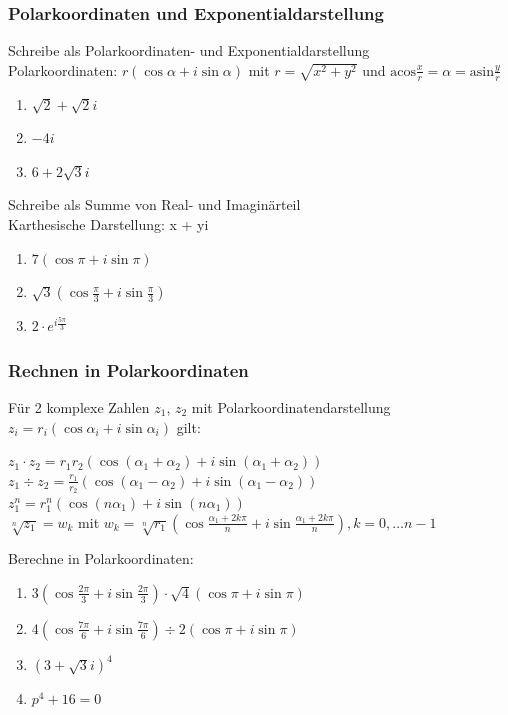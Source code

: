 \documentclass[11pt, a4paper]{article}
\newcommand\braces[1]{\left(#1\right)}
\newcommand{\acos}{\mathrm{acos}}
\newcommand{\asin}{\mathrm{asin}}
\begin{document}
\subsubsection{Polarkoordinaten und Exponentialdarstellung}
Schreibe als Polarkoordinaten- und Exponentialdarstellung \\
Polarkoordinaten: $r(\cos \alpha + i \sin \alpha)$ mit $r=\sqrt{x^2+y^2}$ und $\acos \frac{x}{r} = \alpha = \asin \frac{y}{r}$
\begin{enumerate}
	\item $\sqrt{2}+\sqrt{2}i$
	\item $-4i$
	\item $6+2\sqrt{3}i$
\end{enumerate}
Schreibe als Summe von Real- und Imaginärteil \\
Karthesische Darstellung: x + yi
\begin{enumerate}
	\item $7 \left( \cos \pi + i \sin \pi \right)$
	\item $\sqrt{3} \left( \cos \frac{\pi}{3} + i \sin \frac{\pi}{3} \right)$
	\item $2 \cdot e^{i \frac{5 \pi}{3}}$
\end{enumerate}

\subsubsection{Rechnen in Polarkoordinaten}
Für 2 komplexe Zahlen $z_1$, $z_2$ mit Polarkoordinatendarstellung $z_i = r_i \braces{\cos \alpha_i + i \sin \alpha_i}$ gilt:

$z_1 \cdot z_2 = r_1 r_2 \braces{ \cos \braces{\alpha_1 + \alpha_2} + i \sin \braces{\alpha_1 + \alpha_2}}$ \\
$z_1 \div z_2 = \frac{r_1}{r_2} \braces{\cos \braces{\alpha_1 - \alpha_2} + i \sin \braces{\alpha_1 - \alpha_2}}$ \\
$z_1^n = r_1^n \braces{\cos (n \alpha_1) + i \sin (n \alpha_1)}$ \\
$\sqrt[n]{z_1} = w_k$ mit $w_k = \sqrt[n]{r_1} \braces{\cos \frac{\alpha_1 + 2k\pi}{n} + i \sin \frac{\alpha_1 + 2k\pi}{n}}, k = 0, \dots n-1$

Berechne in Polarkoordinaten:
\begin{enumerate}
	\item $3 \left( \cos \frac{2\pi}{3} + i \sin \frac{2\pi}{3} \right) \cdot \sqrt{4} \left( \cos \pi + i \sin \pi \right)$
	\item $4 \left( \cos \frac{7\pi}{6} + i \sin \frac{7\pi}{6} \right) \div 2 \left( \cos \pi + i \sin \pi \right)$
	\item $\left( 3+\sqrt{3}i \right)^4$
	\item $p^4 + 16 = 0$
\end{enumerate}
\end{document}
